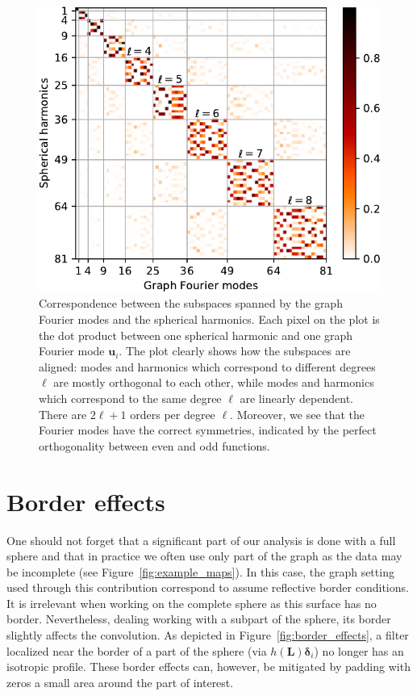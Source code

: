 \documentclass[final,twocolumn,3p,times,sort&compress]{elsarticle}
\newcommand{\figref}[1]{Figure~\ref{fig:#1}}
\renewcommand{\b}[1]{{\bm{#1}}}   %
\newcommand{\1}{\b{1}}              %
\newcommand{\0}{\b{0}}              %
\renewcommand{\L}{\b{L}}
\begin{document}
\begin{figure}
	\centering
	\includegraphics[width=\linewidth]{subspace_harmonics_eigenvectors}
	\caption{Correspondence between the subspaces spanned by the graph Fourier modes and the spherical harmonics. Each pixel on the plot is the dot product between one spherical harmonic and one graph Fourier mode $\b u_i$. The plot clearly shows how the subspaces are aligned: modes and harmonics which correspond to different degrees $\ell$ are mostly orthogonal to each other, while modes and harmonics which correspond to the same degree $\ell$ are linearly dependent. There are $2 \ell + 1$ orders per degree $\ell$. Moreover, we see that the Fourier modes have the correct symmetries, indicated by the perfect orthogonality between even and odd functions.}
	\label{fig:subspace_harmonics_eigenvectors}
\end{figure}

\section{Border effects}
\label{sec:border_effects}

One should not forget that a significant part of our analysis is done with a full sphere and that in practice we often use only part of the graph as the data may be incomplete (see \figref{example_maps}).
In this case, the graph setting used through this contribution correspond to assume reflective border conditions.
It is irrelevant when working on the complete sphere as this surface has no border. Nevertheless, dealing working with a subpart of the sphere, its border slightly affects the convolution.
As depicted in \figref{border_effects}, a filter localized near the border of a part of the sphere (via $h(\L) \b \delta_i$) no longer has an isotropic profile.
These border effects can, however, be mitigated by padding with zeros a small area around the part of interest.
\end{document}
